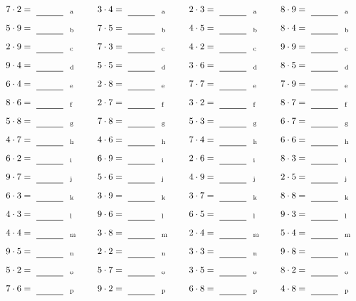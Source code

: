 \documentclass
[
  draft    = true,
  fontsize = 11pt,
  parskip  = half-
]
{scrartcl}
\begin{document}
\par\vfill\par
\begin{align*}
    \pline{7\cdot2}&=\rline{a}
  & \pline{3\cdot4}&=\rline{a}
  & \pline{2\cdot3}&=\rline{a}
  & \pline{8\cdot9}&=\rline{a} \\[1ex]
    \pline{5\cdot9}&=\rline{b}
  & \pline{7\cdot5}&=\rline{b}
  & \pline{4\cdot5}&=\rline{b}
  & \pline{8\cdot4}&=\rline{b} \\[1ex]
    \pline{2\cdot9}&=\rline{c}
  & \pline{7\cdot3}&=\rline{c}
  & \pline{4\cdot2}&=\rline{c}
  & \pline{9\cdot9}&=\rline{c} \\[1ex]
    \pline{9\cdot4}&=\rline{d}
  & \pline{5\cdot5}&=\rline{d}
  & \pline{3\cdot6}&=\rline{d}
  & \pline{8\cdot5}&=\rline{d} \\[1ex]
    \pline{6\cdot4}&=\rline{e}
  & \pline{2\cdot8}&=\rline{e}
  & \pline{7\cdot7}&=\rline{e}
  & \pline{7\cdot9}&=\rline{e} \\[1ex]
    \pline{8\cdot6}&=\rline{f}
  & \pline{2\cdot7}&=\rline{f}
  & \pline{3\cdot2}&=\rline{f}
  & \pline{8\cdot7}&=\rline{f} \\[1ex]
    \pline{5\cdot8}&=\rline{g}
  & \pline{7\cdot8}&=\rline{g}
  & \pline{5\cdot3}&=\rline{g}
  & \pline{6\cdot7}&=\rline{g} \\[1ex]
    \pline{4\cdot7}&=\rline{h}
  & \pline{4\cdot6}&=\rline{h}
  & \pline{7\cdot4}&=\rline{h}
  & \pline{6\cdot6}&=\rline{h} \\[1ex]
    \pline{6\cdot2}&=\rline{i}
  & \pline{6\cdot9}&=\rline{i}
  & \pline{2\cdot6}&=\rline{i}
  & \pline{8\cdot3}&=\rline{i} \\[1ex]
    \pline{9\cdot7}&=\rline{j}
  & \pline{5\cdot6}&=\rline{j}
  & \pline{4\cdot9}&=\rline{j}
  & \pline{2\cdot5}&=\rline{j} \\[1ex]
    \pline{6\cdot3}&=\rline{k}
  & \pline{3\cdot9}&=\rline{k}
  & \pline{3\cdot7}&=\rline{k}
  & \pline{8\cdot8}&=\rline{k} \\[1ex]
    \pline{4\cdot3}&=\rline{l}
  & \pline{9\cdot6}&=\rline{l}
  & \pline{6\cdot5}&=\rline{l}
  & \pline{9\cdot3}&=\rline{l} \\[1ex]
    \pline{4\cdot4}&=\rline{m}
  & \pline{3\cdot8}&=\rline{m}
  & \pline{2\cdot4}&=\rline{m}
  & \pline{5\cdot4}&=\rline{m} \\[1ex]
    \pline{9\cdot5}&=\rline{n}
  & \pline{2\cdot2}&=\rline{n}
  & \pline{3\cdot3}&=\rline{n}
  & \pline{9\cdot8}&=\rline{n} \\[1ex]
    \pline{5\cdot2}&=\rline{o}
  & \pline{5\cdot7}&=\rline{o}
  & \pline{3\cdot5}&=\rline{o}
  & \pline{8\cdot2}&=\rline{o} \\[1ex]
    \pline{7\cdot6}&=\rline{p}
  & \pline{9\cdot2}&=\rline{p}
  & \pline{6\cdot8}&=\rline{p}
  & \pline{4\cdot8}&=\rline{p}
\end{align*}
\end{document}
